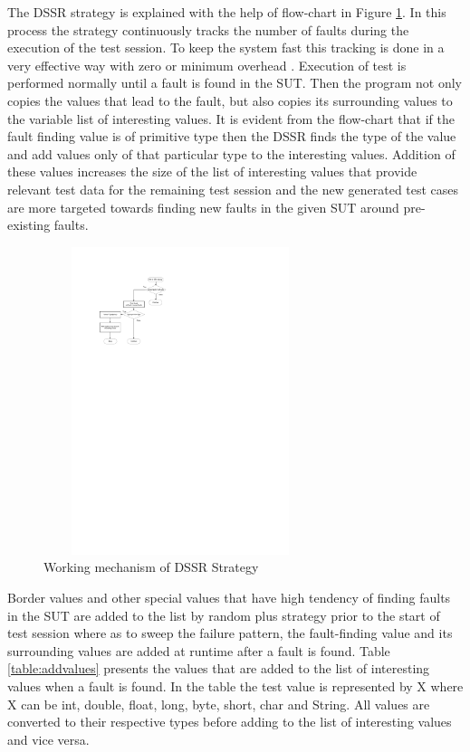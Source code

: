 \documentclass[conference]{IEEEtran}
\begin{document}
The DSSR strategy is explained with the help of flow-chart in Figure \ref{fig:Working_DSSS}. In this process the strategy continuously tracks the number of faults during the execution of the test session. To keep the system fast this tracking is done in a very effective way with zero or minimum overhead \cite{Leitner2009}. Execution of test is performed normally until a fault is found in the SUT. Then the program not only copies the values that lead to the fault, but also copies its surrounding values to the variable list of interesting values. It is evident from the flow-chart that if the fault finding value is of primitive type then the DSSR finds the type of the value and add values only of that particular type to the interesting values. Addition of these values increases the size of the list of interesting values that provide relevant test data for the remaining test session and the new generated test cases are more targeted towards finding new faults in the given SUT around pre-existing faults.

\begin{figure}[ht]
\centering
\includegraphics[width=8cm,height=9cm]{flowchart1.pdf}
\caption{Working mechanism of DSSR Strategy}
\label{fig:Working_DSSS}
\end{figure}

Border values and other special values that have high tendency of finding faults in the SUT are added to the list by random plus strategy prior to the start of test session where as to sweep the failure pattern, the fault-finding value and its surrounding values are added at runtime after a fault is found. Table \ref{table:addvalues} presents the values that are added to the list of interesting values when a fault is found. In the table the test value is represented by X where X can be int, double, float, long, byte, short, char and String. All values are converted to their respective types before adding to the list of interesting values and vice versa.
\end{document}

